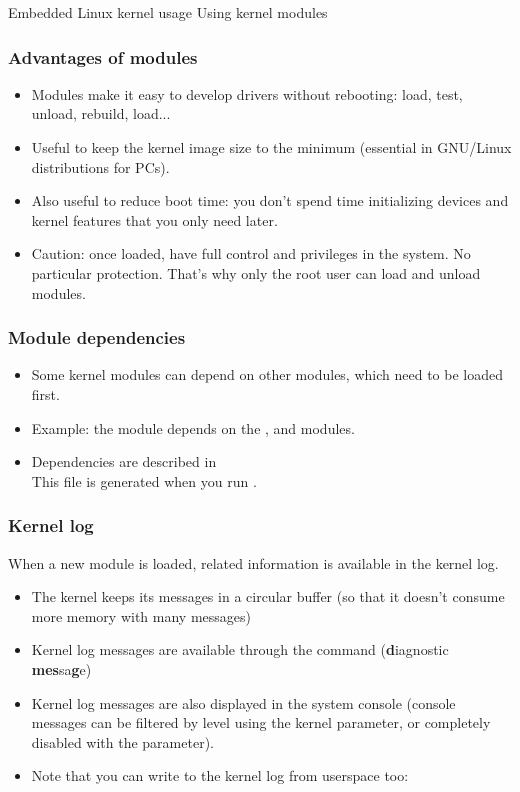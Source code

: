 \subchapterframe
{Embedded Linux kernel usage}
{Using kernel modules}

\begin{frame}
  \frametitle{Advantages of modules}
  \begin{itemize}
  \item Modules make it easy to develop drivers without rebooting:
    load, test, unload, rebuild, load...
  \item Useful to keep the kernel image size to the minimum (essential
    in GNU/Linux distributions for PCs).
  \item Also useful to reduce boot time: you don't spend time
    initializing devices and kernel features that you only need later.
  \item Caution: once loaded, have full control and privileges in the
    system. No particular protection. That's why only the root user
    can load and unload modules.
  \end{itemize}
\end{frame}

\begin{frame}
  \frametitle{Module dependencies}
  \begin{itemize}
  \item Some kernel modules can depend on other modules,
    which need to be loaded first.
  \item Example: the  module depends on the
    ,  and  modules.
  \item Dependencies are described
    in \\
    This file is generated when you run .
  \end{itemize}
\end{frame}

\begin{frame}
  \frametitle{Kernel log}

  When a new module is loaded, related information is available in the
  kernel log.
  \begin{itemize}
  \item The kernel keeps its messages in a circular buffer (so that it
    doesn't consume more memory with many messages)
  \item Kernel log messages are available through the 
    command ({\bf d}iagnostic {\bf mes}sa{\bf g}e)
  \item Kernel log messages are also displayed in the system console
    (console messages can be filtered by level using the
     kernel parameter, or completely disabled with the
     parameter).
  \item Note that you can write to the kernel log from userspace too:\\
  \end{itemize}
\end{frame}

